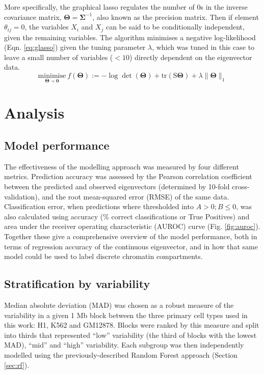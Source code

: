 \documentclass[a4paper]{report}
\begin{document}
More specifically, the graphical lasso regulates the number of 0s in
the inverse covariance matrix, $\bm{\Theta}=\bm{\Sigma}^{-1}$, also known as the
precision matrix. Then if element $\theta_{ij}=0$, the variables $X_i$ and $X_j$ can be said to be
conditionally independent, given the remaining
variables.\cite{Mazumder2012} The algorithm minimises a negative
log-likelihood (Eqn. \ref{eq:glasso}\cite{Mazumder2012}) given the tuning parameter $\lambda$, which was tuned
in this case to leave a small number of variables ($<10$)
directly dependent on the eigenvector data. \\
\begin{equation} \label{eq:glasso}
\underset{\bm{\Theta}\prec\bm{0}}{\mathrm{minimise}}~f(\bm{\Theta}) :=
-\log\det(\bm{\Theta}) + \mathrm{tr}(\bm{\mathrm{S}\Theta}) + \lambda
\lVert\bm{\Theta}\rVert_1
\end{equation}

\section{Analysis}
\subsection{Model performance}
The effectiveness of the modelling approach was measured by four
different metrics. Prediction accuracy was assessed by the Pearson correlation coefficient between the
predicted and observed eigenvectors (determined by 10-fold
cross-validation), and the root mean-squared error (RMSE) of the same
data. Classification error, when predictions where thresholded into
$A>0; B\leq0$, was also calculated using accuracy (\% correct
classifications or True Positives) and area under the receiver
operating characteristic (AUROC) curve (Fig. \ref{fig:auroc}). Together these
give a comprehensive overview of the model performance, both in terms
of regression accuracy of the continuous eigenvector, and in how that
same model could be used to label discrete chromatin compartments.

\subsection{Stratification by variability}\label{meth:strat}
Median absolute deviation (MAD) was chosen as a robust measure of the
variability in a given 1 Mb block between the three primary cell types
used in this work: H1, K562 and GM12878. Blocks were ranked by this
measure and split into thirds that represented ``low'' variability
(the third of blocks with the lowest MAD), ``mid'' and ``high''
variability. Each subgroup was then independently modelled using the previously-described 
Random Forest approach (Section \ref{sec:rf}). \\
\end{document}
